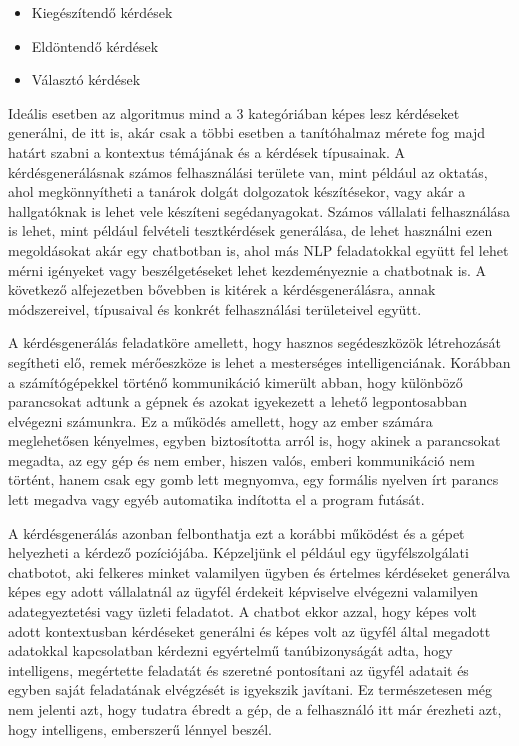 \begin{itemize}
\item Kiegészítendő kérdések
\item Eldöntendő kérdések
\item Választó kérdések
\end{itemize}

Ideális esetben az algoritmus mind a 3 kategóriában képes lesz kérdéseket generálni, de itt is, akár csak a többi esetben a tanítóhalmaz mérete fog majd határt szabni a kontextus témájának és a kérdések típusainak. A kérdésgenerálásnak számos felhasználási területe van, mint például az oktatás, ahol megkönnyítheti a tanárok dolgát dolgozatok készítésekor, vagy akár a hallgatóknak is lehet vele készíteni segédanyagokat. Számos vállalati felhasználása is lehet, mint például felvételi tesztkérdések generálása, de lehet használni ezen megoldásokat akár egy chatbotban is, ahol más NLP feladatokkal együtt fel lehet mérni igényeket vagy beszélgetéseket lehet kezdeményeznie a chatbotnak is. A következő alfejezetben bővebben is kitérek a kérdésgenerálásra, annak módszereivel, típusaival és konkrét felhasználási területeivel együtt.
 

A kérdésgenerálás feladatköre amellett, hogy hasznos segédeszközök létrehozását segítheti elő, remek mérőeszköze is lehet a mesterséges intelligenciának. Korábban a számítógépekkel történő kommunikáció kimerült abban, hogy különböző parancsokat adtunk a gépnek és azokat igyekezett a lehető legpontosabban elvégezni számunkra. Ez a működés amellett, hogy az ember számára meglehetősen kényelmes, egyben biztosította arról is, hogy akinek a parancsokat megadta, az egy gép és nem ember, hiszen valós, emberi kommunikáció nem történt, hanem csak egy gomb lett megnyomva, egy formális nyelven írt parancs lett megadva vagy egyéb automatika indította el a program futását.

A kérdésgenerálás azonban felbonthatja ezt a korábbi működést és a gépet helyezheti a kérdező pozíciójába. Képzeljünk el például egy ügyfélszolgálati chatbotot, aki felkeres minket valamilyen ügyben és értelmes kérdéseket generálva képes egy adott vállalatnál az ügyfél érdekeit képviselve elvégezni valamilyen adategyeztetési vagy üzleti feladatot. A chatbot ekkor azzal, hogy képes volt adott kontextusban kérdéseket generálni és képes volt az ügyfél által megadott adatokkal kapcsolatban kérdezni egyértelmű tanúbizonyságát adta, hogy intelligens, megértette feladatát és szeretné pontosítani az ügyfél adatait és egyben saját feladatának elvégzését is igyekszik javítani. Ez természetesen még nem jelenti azt, hogy tudatra ébredt a gép, de a felhasználó itt már érezheti azt, hogy intelligens, emberszerű lénnyel beszél.

